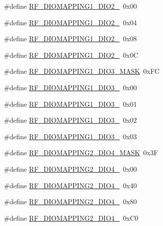 \begin{DoxyCompactItemize}
\item 
\#define \hyperlink{sx1276Regs-Fsk_8h_a6db6d0433fa092c1c499001f8b5a3a1a}{R\+F\+\_\+\+D\+I\+O\+M\+A\+P\+P\+I\+N\+G1\+\_\+\+D\+I\+O2\+\_}~0x00
\item 
\#define \hyperlink{sx1276Regs-Fsk_8h_a6f88625f3e51cbfacd0c8328d448fce4}{R\+F\+\_\+\+D\+I\+O\+M\+A\+P\+P\+I\+N\+G1\+\_\+\+D\+I\+O2\+\_}~0x04
\item 
\#define \hyperlink{sx1276Regs-Fsk_8h_ad121efc538b9ec91c270343fc829fb36}{R\+F\+\_\+\+D\+I\+O\+M\+A\+P\+P\+I\+N\+G1\+\_\+\+D\+I\+O2\+\_}~0x08
\item 
\#define \hyperlink{sx1276Regs-Fsk_8h_a8f9393d8018c3a4699ac487c2e133a55}{R\+F\+\_\+\+D\+I\+O\+M\+A\+P\+P\+I\+N\+G1\+\_\+\+D\+I\+O2\+\_}~0x0C
\item 
\#define \hyperlink{sx1276Regs-Fsk_8h_a43ae7365b7ce0d2f75e25cd32c48c6e5}{R\+F\+\_\+\+D\+I\+O\+M\+A\+P\+P\+I\+N\+G1\+\_\+\+D\+I\+O3\+\_\+\+M\+A\+SK}~0x\+FC
\item 
\#define \hyperlink{sx1276Regs-Fsk_8h_ae678538a0f95f5fece5e9bf1e81a5a86}{R\+F\+\_\+\+D\+I\+O\+M\+A\+P\+P\+I\+N\+G1\+\_\+\+D\+I\+O3\+\_}~0x00
\item 
\#define \hyperlink{sx1276Regs-Fsk_8h_a04646c3e0ad7972da0c719126f656a91}{R\+F\+\_\+\+D\+I\+O\+M\+A\+P\+P\+I\+N\+G1\+\_\+\+D\+I\+O3\+\_}~0x01
\item 
\#define \hyperlink{sx1276Regs-Fsk_8h_a950ee75b1c397a6b2f06f2f7269471fe}{R\+F\+\_\+\+D\+I\+O\+M\+A\+P\+P\+I\+N\+G1\+\_\+\+D\+I\+O3\+\_}~0x02
\item 
\#define \hyperlink{sx1276Regs-Fsk_8h_a73c2510210ed9b4605d4fbbadc7e5ed1}{R\+F\+\_\+\+D\+I\+O\+M\+A\+P\+P\+I\+N\+G1\+\_\+\+D\+I\+O3\+\_}~0x03
\item 
\#define \hyperlink{sx1276Regs-Fsk_8h_a9415ebcccf7fd73e9c6e9de0b71a4be8}{R\+F\+\_\+\+D\+I\+O\+M\+A\+P\+P\+I\+N\+G2\+\_\+\+D\+I\+O4\+\_\+\+M\+A\+SK}~0x3F
\item 
\#define \hyperlink{sx1276Regs-Fsk_8h_a2c1e484d67c2b59da0b2b1f4de011000}{R\+F\+\_\+\+D\+I\+O\+M\+A\+P\+P\+I\+N\+G2\+\_\+\+D\+I\+O4\+\_}~0x00
\item 
\#define \hyperlink{sx1276Regs-Fsk_8h_a4ee426f706b74f90c0a6225669a87c6c}{R\+F\+\_\+\+D\+I\+O\+M\+A\+P\+P\+I\+N\+G2\+\_\+\+D\+I\+O4\+\_}~0x40
\item 
\#define \hyperlink{sx1276Regs-Fsk_8h_a6d6eff0baca6f8041d58b483f29c1477}{R\+F\+\_\+\+D\+I\+O\+M\+A\+P\+P\+I\+N\+G2\+\_\+\+D\+I\+O4\+\_}~0x80
\item 
\#define \hyperlink{sx1276Regs-Fsk_8h_a04ef85b93c2ee7e32c2992dbcf60781c}{R\+F\+\_\+\+D\+I\+O\+M\+A\+P\+P\+I\+N\+G2\+\_\+\+D\+I\+O4\+\_}~0x\+C0

\end{DoxyCompactItemize}
